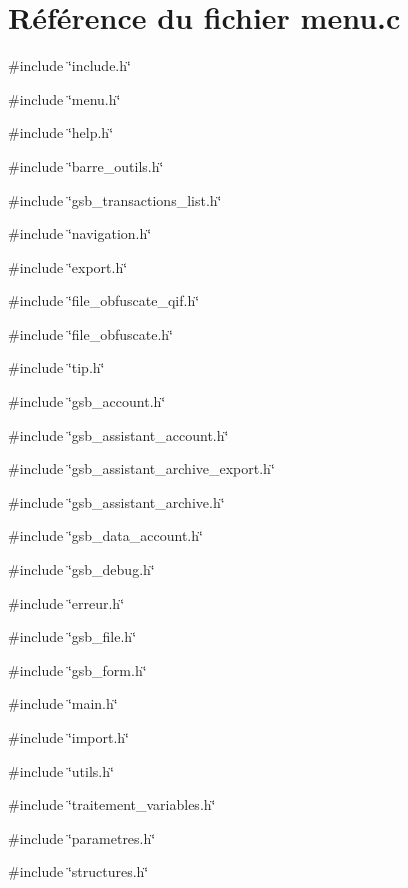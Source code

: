 \section{Référence du fichier menu.c}
\label{menu_8c}
{\ttfamily \#include \char`\"{}include.h\char`\"{}}\par
{\ttfamily \#include \char`\"{}menu.h\char`\"{}}\par
{\ttfamily \#include \char`\"{}help.h\char`\"{}}\par
{\ttfamily \#include \char`\"{}barre\_\-outils.h\char`\"{}}\par
{\ttfamily \#include \char`\"{}gsb\_\-transactions\_\-list.h\char`\"{}}\par
{\ttfamily \#include \char`\"{}navigation.h\char`\"{}}\par
{\ttfamily \#include \char`\"{}export.h\char`\"{}}\par
{\ttfamily \#include \char`\"{}file\_\-obfuscate\_\-qif.h\char`\"{}}\par
{\ttfamily \#include \char`\"{}file\_\-obfuscate.h\char`\"{}}\par
{\ttfamily \#include \char`\"{}tip.h\char`\"{}}\par
{\ttfamily \#include \char`\"{}gsb\_\-account.h\char`\"{}}\par
{\ttfamily \#include \char`\"{}gsb\_\-assistant\_\-account.h\char`\"{}}\par
{\ttfamily \#include \char`\"{}gsb\_\-assistant\_\-archive\_\-export.h\char`\"{}}\par
{\ttfamily \#include \char`\"{}gsb\_\-assistant\_\-archive.h\char`\"{}}\par
{\ttfamily \#include \char`\"{}gsb\_\-data\_\-account.h\char`\"{}}\par
{\ttfamily \#include \char`\"{}gsb\_\-debug.h\char`\"{}}\par
{\ttfamily \#include \char`\"{}erreur.h\char`\"{}}\par
{\ttfamily \#include \char`\"{}gsb\_\-file.h\char`\"{}}\par
{\ttfamily \#include \char`\"{}gsb\_\-form.h\char`\"{}}\par
{\ttfamily \#include \char`\"{}main.h\char`\"{}}\par
{\ttfamily \#include \char`\"{}import.h\char`\"{}}\par
{\ttfamily \#include \char`\"{}utils.h\char`\"{}}\par
{\ttfamily \#include \char`\"{}traitement\_\-variables.h\char`\"{}}\par
{\ttfamily \#include \char`\"{}parametres.h\char`\"{}}\par
{\ttfamily \#include \char`\"{}structures.h\char`\"{}}\par
